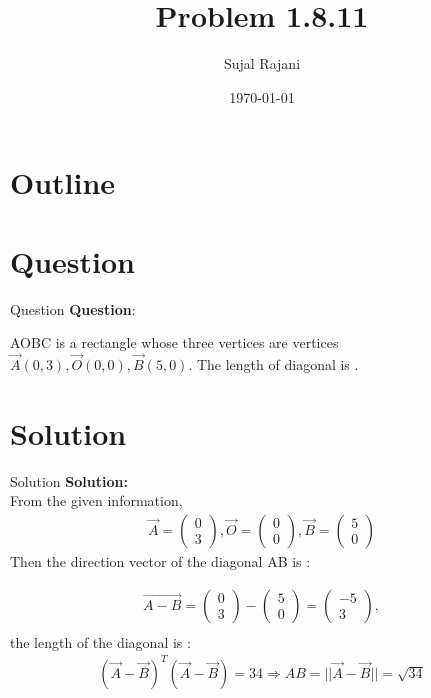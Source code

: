 \documentclass{beamer}
\title{Problem 1.8.11}
\author{Sujal Rajani}
\date{\today}
\theoremstyle{remark}
\newcommand{\myvec}[1]{\ensuremath{\begin{pmatrix}#1\end{pmatrix}}}
\numberwithin{equation}{section}
\begin{document}
\begin{frame}
\titlepage
\end{frame}

\section*{Outline}
\begin{frame}
\tableofcontents
\end{frame}
\section{Question}
\begin{frame}{Question}
\textbf{Question}:


\noindent AOBC is a rectangle whose three vertices are vertices $\vec{A}(0,3),\vec{O}(0,0),\vec{B}(5,0)$. The 
length of diagonal is \underline{\hspace{2cm}}.   

\end{frame}

    

\section{Solution}
\begin{frame}{Solution}
\textbf{Solution:} 
\\
From the given information,
\begin{align}
		\vec{A} = \myvec{0\\3},\vec{O} = \myvec{0\\0},\vec{B} = \myvec{5\\0} 
\end{align}
Then the direction vector  of the diagonal AB is :

\begin{align}
    \vec{A-B}=\myvec{0\\3}-\myvec{5\\0}=\myvec{-5\\3},
    \\
  \end{align}
the length of the diagonal is :
\begin{align}
    (\vec{A}-\vec{B})^T(\vec{A}-\vec{B})=34    
     \Rightarrow AB=||\vec{A}-\vec{B}||=\sqrt{34}	 
    \end{align}
    \end{frame}
\end{document}
